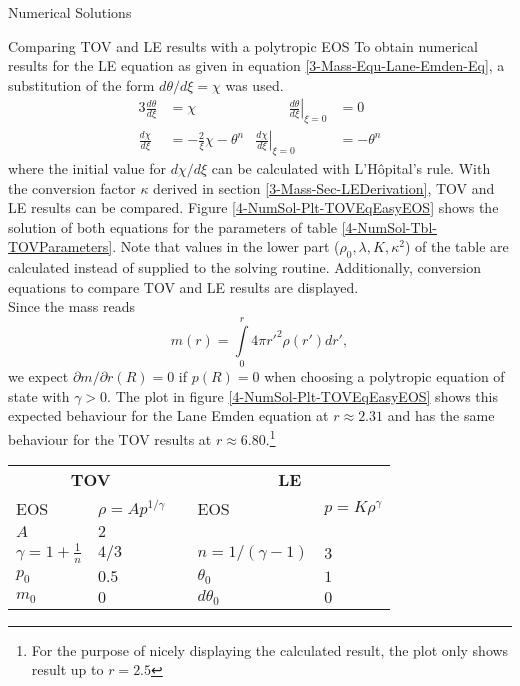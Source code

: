 \begin{section}{Numerical Solutions}
\begin{subsection}{Comparing TOV and LE results with a polytropic EOS}
To obtain numerical results for the \ac{LE} equation as given in equation \eqref{3-Mass-Equ-Lane-Emden-Eq}, a substitution of the form $d\theta/d\xi=\chi$ was used.
\begin{alignat}{3}
	\frac{d\theta}{d\xi} &= \chi &\hspace{1cm} \left.\frac{d\theta}{d\xi}\right|_{\xi=0} &= 0\\
	\frac{d\chi}{d\xi} &= -\frac{2}{\xi}\chi-\theta^n & \left.\frac{d\chi}{d\xi}\right|_{\xi=0} &= -\theta^n
	\label{4-NumSol-Equ-LE-Substitution}
\end{alignat}
where the initial value for $d\chi/d\xi$ can be calculated with L'Hôpital's rule. 
With the conversion factor $\kappa$ derived in section \ref{3-Mass-Sec-LEDerivation}, \ac{TOV} and \ac{LE} results can be compared. 
Figure \ref{4-NumSol-Plt-TOVEqEasyEOS} shows the solution of both equations for the parameters of table \ref{4-NumSol-Tbl-TOVParameters}.%
Note that values in the lower part ($\rho_0,\lambda,K,\kappa^2$) of the table are calculated instead of supplied to the solving routine.
Additionally, conversion equations to compare \ac{TOV} and \ac{LE} results are displayed.\\
Since the mass reads
\begin{equation}
	m(r) = \int\limits_0^r 4\pi r'^2\rho(r')dr',
\end{equation}
we expect $\partial m/\partial r(R)=0$ if $p(R)=0$ when choosing a polytropic equation of state with $\gamma>0$. 
The plot in figure \ref{4-NumSol-Plt-TOVEqEasyEOS} shows this expected behaviour for the Lane Emden equation at $r\approx2.31$ and has the same behaviour for the \ac{TOV} results at $r\approx6.80$.\footnote{For the purpose of nicely displaying the calculated result, the plot only shows result up to $r=2.5$}
\begin{table}[H]
	\renewcommand{\arraystretch}{1.2}
	\centering
	\begin{tabular}{@{}llcll@{}}
		\toprule
		\multicolumn{2}{c}{\textbf{TOV}} & \phantom{abc} &\multicolumn{2}{c}{\textbf{LE}}\\
		\cmidrule{1-2} \cmidrule{4-5}
		EOS & $\rho=Ap^{1/\gamma}$ && EOS & $p=K\rho^{\gamma}$\\
		$A$ & $2$ & & \\
		$\gamma=1+\frac{1}{n}$ & $4/3$ && $n=1/(\gamma-1)$ & $3$\\
		$p_0$ & $0.5$ && $\theta_0$ & $1$\\
		$m_0$ & $0$ && $d\theta_0$ & $0$\\

\end{tabular}
\end{table}
\end{subsection}
\end{section}
